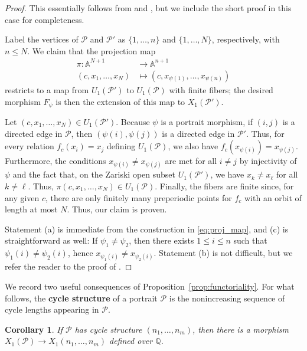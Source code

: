 \documentclass[12pt]{amsart}
\newtheorem{cor}[thm]{Corollary}
\theoremstyle{definition}
\newcommand{\bbA}{\mathbb{A}}
\newcommand{\bbQ}{\mathbb{Q}}
\newcommand{\calP}{\mathcal{P}}
\newcommand{\longto}{\longrightarrow}
\numberwithin{equation}{section}
\begin{document}
\begin{proof}
    This essentially follows from \cite[Proposition 3.3]{doyle:2019} and \cite[Theorem 10.1(c)]{doyle/silverman:2020}, but we include the short proof in this case for completeness.

    Label the vertices of $\calP$ and $\calP'$ as $\{1,\ldots,n\}$ and $\{1,\ldots,N\}$, respectively, with $n \le N$. We claim that the projection map
        \begin{equation}\label{eq:proj_map}
            \begin{split}
            \pi : \bbA^{N+1} &\longto \bbA^{n+1}\\
            (c,x_1,\ldots,x_N) &\longmapsto (c,x_{\psi(1)},\ldots,x_{\psi(n)})
            \end{split}
        \end{equation}
    restricts to a map from $U_1(\calP')$ to $U_1(\calP)$ with finite fibers; the desired morphism $F_\psi$ is then the extension of this map to $X_1(\calP')$.

    Let $(c,x_1,\ldots,x_N) \in U_1(\calP')$. Because $\psi$ is a portrait morphism, if $(i,j)$ is a directed edge in $\calP$, then $(\psi(i), \psi(j))$ is a directed edge in $\calP'$. Thus, for every relation $f_c(x_i) = x_j$ defining $U_1(\calP)$, we also have $f_c(x_{\psi(i)}) = x_{\psi(j)}$. Furthermore, the conditions $x_{\psi(i)} \ne x_{\psi(j)}$ are met for all $i\ne j$ by injectivity of $\psi$ and the fact that, on the Zariski open subset $U_1(\calP')$, we have $x_k \ne x_\ell$ for all $k \ne \ell$. Thus, $\pi(c,x_1,\ldots,x_N) \in U_1(\calP)$. Finally, the fibers are finite since, for any given $c$, there are only finitely many preperiodic points for $f_c$ with an orbit of length at most $N$. Thus, our claim is proven.

    Statement (a) is immediate from the construction in \eqref{eq:proj_map}, and (c) is straightforward as well: If $\psi_1 \ne \psi_2$, then there exists $1 \le i \le n$ such that $\psi_1(i) \ne \psi_2(i)$, hence $x_{\psi_1(i)} \ne x_{\psi_2(i)}$. Statement (b) is not difficult, but we refer the reader to the proof of \cite[Proposition 3.3]{doyle:2019}.
\end{proof}

We record two useful consequences of Proposition~\ref{prop:functoriality}.
For what follows, the {\bf cycle structure} of a portrait $\calP$ is the nonincreasing sequence of cycle lengths appearing in $\calP$.

\begin{cor}
If $\calP$ has cycle structure $(n_1,\ldots,n_m)$, then there is a morphism $X_1(\calP) \to X_1(n_1,\ldots,n_m)$ defined over $\bbQ$.
\end{cor}
\end{document}
